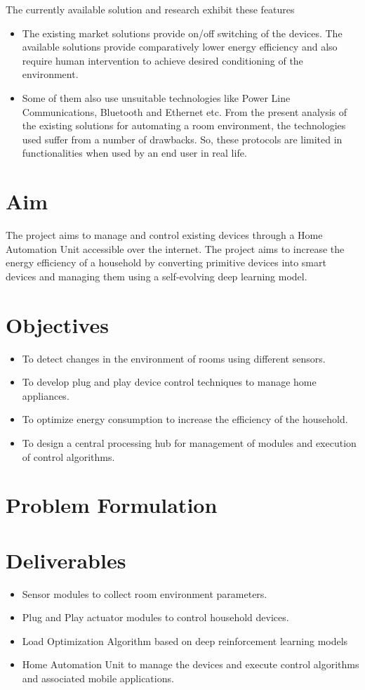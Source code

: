         	The currently available solution and research exhibit these features
        	\begin{itemize}
        		\item The existing market solutions provide on/off switching of the devices. The available solutions provide comparatively lower energy efficiency and also require human intervention to achieve desired conditioning of the environment.
        		\item Some of them also use unsuitable technologies like Power Line Communications, Bluetooth and Ethernet etc. From the present analysis of the existing solutions for automating a room environment, the technologies used suffer from a number of drawbacks. So, these protocols are limited in functionalities when used by an end user in real life.
        	\end{itemize}
        	
        \section{Aim}
        	The project aims to manage and control existing devices through a Home Automation Unit accessible over the internet.
        	The project aims to increase the energy efficiency of a household by converting primitive devices into smart devices and managing them using a self-evolving deep learning model.
        \section{Objectives}
	        \begin{itemize}
	        	\item To detect changes in the environment of rooms using different sensors.
	        	\item To develop plug and play device control techniques to manage home appliances.
	        	\item To optimize energy consumption to increase the efficiency of the household.
	        	\item To design a central processing hub for management of modules and execution of control algorithms.
	        \end{itemize}
        \section{Problem Formulation}
        \section{Deliverables}
        	\begin{itemize}
        		\item Sensor modules to collect room environment parameters.
        		\item Plug and Play actuator modules to control household devices.
        		\item Load Optimization Algorithm based on deep reinforcement learning models
        		\item Home Automation Unit to manage the devices and execute control algorithms and associated mobile applications.		
        	\end{itemize}
